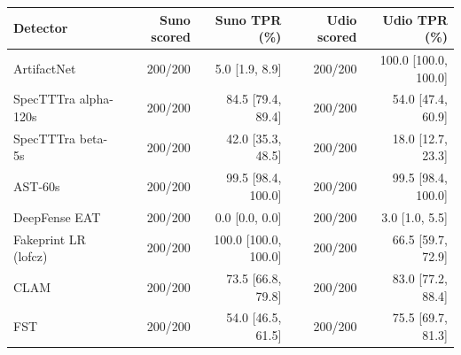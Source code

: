 \begin{tabular}{lrrrr}
\toprule
Detector & Suno scored & Suno TPR (\%) & Udio scored & Udio TPR (\%) \\
\midrule
ArtifactNet & 200/200 & 5.0 [1.9, 8.9] & 200/200 & 100.0 [100.0, 100.0] \\
SpecTTTra alpha-120s & 200/200 & 84.5 [79.4, 89.4] & 200/200 & 54.0 [47.4, 60.9] \\
SpecTTTra beta-5s & 200/200 & 42.0 [35.3, 48.5] & 200/200 & 18.0 [12.7, 23.3] \\
AST-60s & 200/200 & 99.5 [98.4, 100.0] & 200/200 & 99.5 [98.4, 100.0] \\
DeepFense EAT & 200/200 & 0.0 [0.0, 0.0] & 200/200 & 3.0 [1.0, 5.5] \\
Fakeprint LR (lofcz) & 200/200 & 100.0 [100.0, 100.0] & 200/200 & 66.5 [59.7, 72.9] \\
CLAM & 200/200 & 73.5 [66.8, 79.8] & 200/200 & 83.0 [77.2, 88.4] \\
FST & 200/200 & 54.0 [46.5, 61.5] & 200/200 & 75.5 [69.7, 81.3] \\
\bottomrule
\end{tabular}

